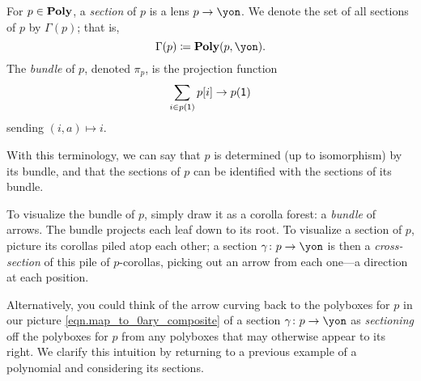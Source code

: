 \documentclass[Book-Poly]{subfiles}
\begin{document}
\begin{definition} \label{def.sec-bun}
  For $p\in\mathbf{Poly}$, a \emph{section} of $p$ is a lens $p\to\yon$.
  We denote the set of all sections of $p$ by $\Gamma(p)$; that is,
  \begin{equation} \label{eqn.gamma_def}
    \Gamma(p)\coloneqq\poly(p,\yon).
  \end{equation}
  The \emph{bundle} of $p$, denoted $\pi_p$, is the projection function
  \[
    \sum_{i\in p(\textsf{1})}p[i]\to p(\textsf{1})
  \]
  sending $(i,a)\mapsto i$.
\end{definition}

With this terminology, we can say that $p$ is determined (up to isomorphism) by its bundle, and that the sections of $p$ can be identified with the sections of its bundle.

To visualize the bundle of $p$, simply draw it as a corolla forest: a \emph{bundle} of arrows.
The bundle projects each leaf down to its root.
To visualize a section of $p$, picture its corollas piled atop each other; a section $\gamma\colon p\to\yon$ is then a \emph{cross-section} of this pile of $p$-corollas, picking out an arrow from each one---a direction at each position.

Alternatively, you could think of the arrow curving back to the polyboxes for $p$ in our picture  \eqref{eqn.map_to_0ary_composite} of a section $\gamma\colon p\to\yon$ as \emph{sectioning} off the polyboxes for $p$ from any polyboxes that may otherwise appear to its right.
We clarify this intuition by returning to a previous example of a polynomial and considering its sections.
\end{document}
